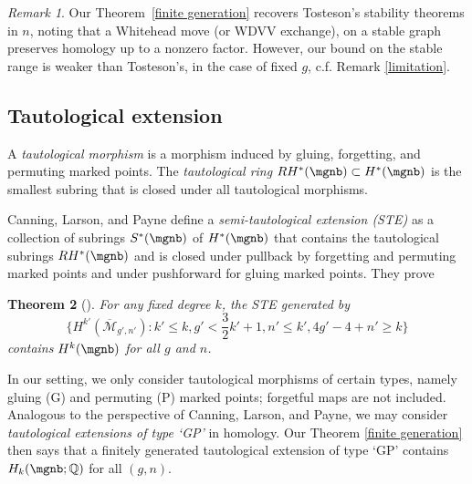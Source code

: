 \documentclass[12pt]{amsart}
\newtheorem{theorem}{Theorem}[section]
\theoremstyle{remark}
\newtheorem{remark}[theorem]{Remark}
\theoremstyle{definition}
\numberwithin{equation}{section}
\begin{document}
\begin{remark}
    Our Theorem~\ref{finite generation} recovers Tosteson's stability theorems in $n$, noting that a Whitehead move (or WDVV exchange), on a stable graph preserves homology up to a nonzero factor. However, our bound on the stable range is weaker than Tosteson's, in the case of fixed $g$, c.f. Remark \ref{limitation}.
\end{remark}



\subsection{Tautological extension}

A \emph{tautological morphism} is a morphism induced by gluing, forgetting, and permuting marked points. The \emph{tautological ring} $RH^*(\mgnb)\subset H^*(\mgnb)$ is the smallest subring that is closed under all tautological morphisms.

Canning, Larson, and Payne \cite{canning2024extensions} define a \emph{semi-tautological extension (STE)} as a collection of subrings $S^*(\mgnb)$ of $H^*(\mgnb)$ that contains the tautological subrings $RH^*(\mgnb)$ and is closed under pullback by forgetting and permuting marked points and under pushforward for gluing marked points. They prove
\begin{theorem}[\cite{canning2024extensions}]
    For any fixed degree $k$, the STE generated by
    \[
    \{H^{k'}(\overline{\mathcal M}_{g',n'}):k'\le k, g'<\frac{3}{2}k'+1,n'\le k', 4g'-4+n'\ge k\}
    \]
    contains $H^k(\mgnb)$ for all $g$ and $n$.
\end{theorem}



In our setting, we only consider tautological morphisms of certain types, namely gluing (G) and permuting (P) marked points; forgetful maps are not included. Analogous to the perspective of Canning, Larson, and Payne, we may consider \emph{tautological extensions of type `GP'} in homology. Our Theorem \ref{finite generation} then says that a finitely generated tautological extension of type `GP' contains $H_k(\mgnb;\mathbb Q)$ for all $(g,n)$.




\end{document}
